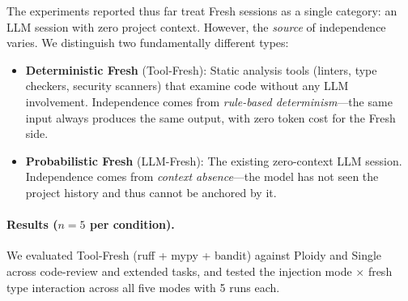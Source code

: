 \documentclass[11pt]{article}
\begin{document}
The experiments reported thus far treat Fresh sessions as a single category: an LLM session with zero project context. However, the \emph{source} of independence varies. We distinguish two fundamentally different types:

\begin{itemize}[leftmargin=1.5em]
  \item \textbf{Deterministic Fresh} (Tool-Fresh): Static analysis tools (linters, type checkers, security scanners) that examine code without any LLM involvement. Independence comes from \emph{rule-based determinism}---the same input always produces the same output, with zero token cost for the Fresh side.
  \item \textbf{Probabilistic Fresh} (LLM-Fresh): The existing zero-context LLM session. Independence comes from \emph{context absence}---the model has not seen the project history and thus cannot be anchored by it.
\end{itemize}

\paragraph{Results ($n{=}5$ per condition).} We evaluated Tool-Fresh (ruff + mypy + bandit) against Ploidy and Single across code-review and extended tasks, and tested the injection mode $\times$ fresh type interaction across all five modes with 5 runs each.
\end{document}
